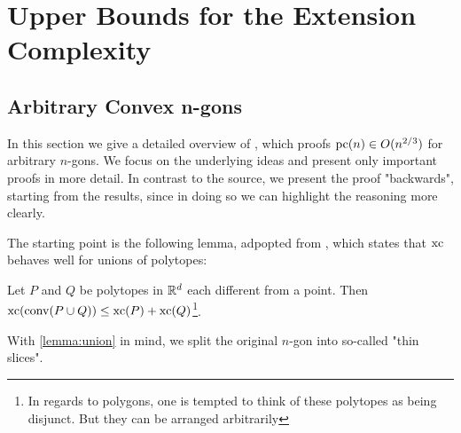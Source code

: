 \section{Upper Bounds for the Extension Complexity}

\subsection{Arbitrary Convex n-gons}

In this section we give a detailed overview of \cite{shitov2020sublinear}, which proofs $\operatorname{pc}(n) \in O(n^{2/3})$ for arbitrary $n$-gons. 
We focus on the underlying ideas and present only important proofs in more detail. In contrast to the source, we present the proof "backwards", starting from the results, since in doing so we can highlight the reasoning more clearly.


The starting point is the following lemma, adpopted from \cite[Proposition 3.1.1]{weltge2015sizes}, which states that $\operatorname{xc}$ behaves well for unions of polytopes:
\begin{lemma}\label{lemma:union}
  Let $P$ and $Q$ be polytopes in $\mathbb{R}^d$ each different from a point. Then $\operatorname{xc}(\operatorname{conv}(P \cup Q)) \leq \operatorname{xc}(P) + \operatorname{xc}(Q)$\footnote{In regards to polygons, one is tempted to think of these polytopes as being disjunct. But they can be arranged arbitrarily}.
\end{lemma}

With \ref{lemma:union} in mind, we split the original $n$-gon into so-called "thin slices".




